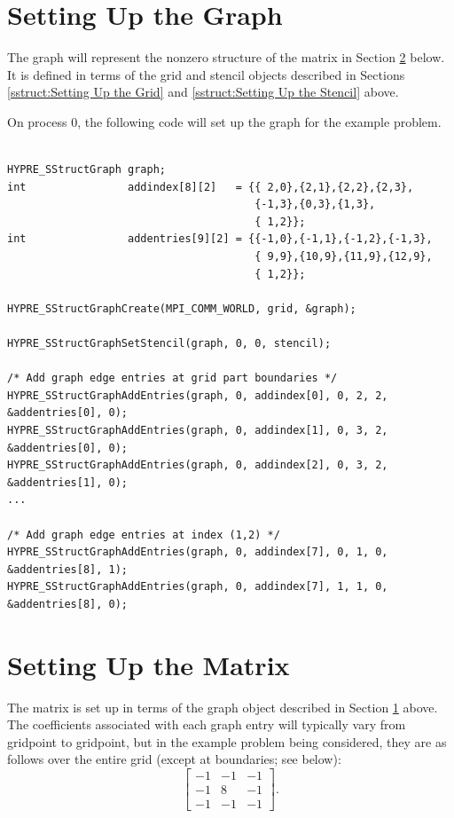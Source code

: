 \section{Setting Up the Graph}
\label{sstruct:Setting Up the Graph}

The graph will represent the nonzero structure of the matrix in
Section \ref{sstruct:Setting Up the Matrix} below.  It is defined in
terms of the grid and stencil objects described in Sections
\ref{sstruct:Setting Up the Grid} and \ref{sstruct:Setting Up the
Stencil} above.

On process 0, the following code will set up the graph for the
example problem.
\begin{display}
\begin{verbatim}

HYPRE_SStructGraph graph;
int                addindex[8][2]   = {{ 2,0},{2,1},{2,2},{2,3},
                                       {-1,3},{0,3},{1,3},
                                       { 1,2}};
int                addentries[9][2] = {{-1,0},{-1,1},{-1,2},{-1,3},
                                       { 9,9},{10,9},{11,9},{12,9},
                                       { 1,2}};

HYPRE_SStructGraphCreate(MPI_COMM_WORLD, grid, &graph);

HYPRE_SStructGraphSetStencil(graph, 0, 0, stencil);

/* Add graph edge entries at grid part boundaries */
HYPRE_SStructGraphAddEntries(graph, 0, addindex[0], 0, 2, 2, &addentries[0], 0);
HYPRE_SStructGraphAddEntries(graph, 0, addindex[1], 0, 3, 2, &addentries[0], 0);
HYPRE_SStructGraphAddEntries(graph, 0, addindex[2], 0, 3, 2, &addentries[1], 0);
...

/* Add graph edge entries at index (1,2) */
HYPRE_SStructGraphAddEntries(graph, 0, addindex[7], 0, 1, 0, &addentries[8], 1);
HYPRE_SStructGraphAddEntries(graph, 0, addindex[7], 1, 1, 0, &addentries[8], 0);

\end{verbatim}
\end{display}


\section{Setting Up the Matrix}
\label{sstruct:Setting Up the Matrix}

The matrix is set up in terms of the graph object described in Section
\ref{sstruct:Setting Up the Graph} above.  The coefficients associated
with each graph entry will typically vary from gridpoint to gridpoint,
but in the example problem being considered, they are as follows over
the entire grid (except at boundaries; see below):
\begin{equation}\label{sstruct:eqn-stencil-laplacian}
\left [
\begin{array}{ccc}
 -1 & -1 & -1 \\
 -1 &  8 & -1 \\
 -1 & -1 & -1 
\end{array}
\right ] .
\end{equation}

